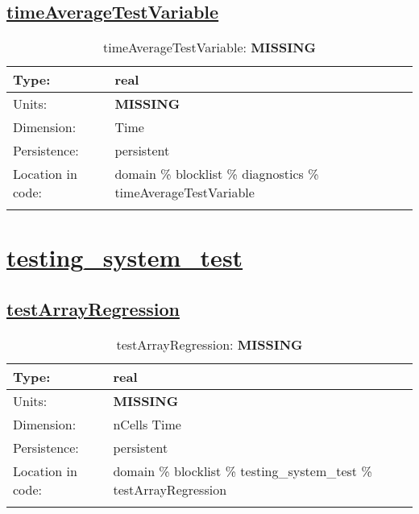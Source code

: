 \subsection[timeAverageTestVariable]{\hyperref[sec:var_tab_diagnostics]{timeAverageTestVariable}}
\label{subsec:var_sec_diagnostics_timeAverageTestVariable}
\begin{center}
\begin{longtable}{| p{2.0in} | p{4.0in} |}
        \hline 
        Type: & real \\
        \hline 
        Units: & {\bf \color{red} MISSING} \\
        \hline 
        Dimension: & Time \\
        \hline 
        Persistence: & persistent \\
        \hline 
         Location in code: & domain \% blocklist \% diagnostics \% timeAverageTestVariable \\
         \hline 
    \caption{timeAverageTestVariable: {\bf \color{red} MISSING}}
\end{longtable}
\end{center}
\section[testing\_system\_test]{\hyperref[sec:var_tab_testing_system_test]{testing\_system\_test}}
\label{sec:var_sec_testing_system_test}
\subsection[testArrayRegression]{\hyperref[sec:var_tab_testing_system_test]{testArrayRegression}}
\label{subsec:var_sec_testing_system_test_testArrayRegression}
\begin{center}
\begin{longtable}{| p{2.0in} | p{4.0in} |}
        \hline 
        Type: & real \\
        \hline 
        Units: & {\bf \color{red} MISSING} \\
        \hline 
        Dimension: & nCells Time \\
        \hline 
        Persistence: & persistent \\
        \hline 
         Location in code: & domain \% blocklist \% testing\_system\_test \% testArrayRegression \\
         \hline 
    \caption{testArrayRegression: {\bf \color{red} MISSING}}
\end{longtable}
\end{center}
